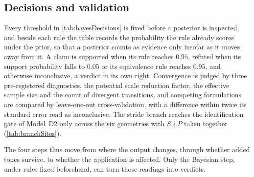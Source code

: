 \endgroup

\subsection{Decisions and validation}\label{sec:decisions}

Every threshold in \autoref{tab:bayesDecisions} is fixed before a posterior is inspected, and beside each rule the table records the probability the rule already scores under the prior, so that a posterior counts as evidence only insofar as it moves away from it. A claim is supported when its rule reaches $0.95$, refuted when its support probability falls to $0.05$ or its equivalence rule reaches $0.95$, and otherwise inconclusive, a verdict in its own right. Convergence is judged by three pre-registered diagnostics, the potential scale reduction factor, the effective sample size and the count of divergent transitions, and competing formulations are compared by leave-one-out cross-validation, with a difference within twice its standard error read as inconclusive. The stride branch reaches the identification gate of Model~D2 only across the six geometries with $S\nmid P$ taken together (\autoref{tab:branchSites}).

The four steps thus move from where the output changes, through whether added tones survive, to whether the application is affected. Only the Bayesian step, under rules fixed beforehand, can turn those readings into verdicts.
